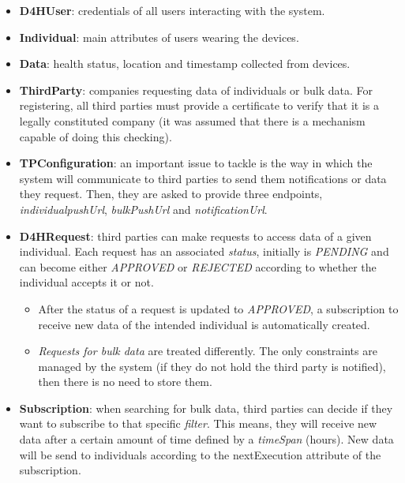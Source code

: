 \documentclass[a4paper, hidelinks, 12pt]{report}
\begin{document}
	\begin{itemize}
		\item{\textbf{D4HUser}}: credentials of all users interacting with the system.
		\item{\textbf{Individual}}: main attributes of users wearing the devices.
		\item{\textbf{Data}}: health status, location and timestamp collected from devices.
		\item{\textbf{ThirdParty}}: companies requesting data of individuals or bulk data. For registering, all third parties must provide a certificate to verify that it is a legally constituted company (it was assumed that there is a mechanism capable of doing this checking).		
		\item{\textbf{TPConfiguration}}: an important issue to tackle is the way in which the system will communicate to third parties to send them notifications or data they request. Then, they are asked to provide three endpoints,
	 \textit{individualpushUrl}, \textit{bulkPushUrl} and \textit{notificationUrl}.	 
		\item{\textbf{D4HRequest}}: third parties can make requests to access data of a given individual. Each request has an associated \textit{status}, initially is \textit{PENDING} and can become either \textit{APPROVED} or \textit{REJECTED} according to whether the individual accepts it or not. 
		\begin{itemize}
		\item After the status of a request is updated to \textit{APPROVED}, a subscription to receive new data of the intended individual is automatically created. 
		\item \textit{Requests for bulk data} are treated differently. The only constraints are managed by the system (if they do not hold the third party is notified), then there is no need to store them.
		\end{itemize}
		\item{\textbf{Subscription}}: when searching for bulk data, third parties can decide if they want to subscribe to that specific \textit{filter}. This means, they will receive new data after a certain amount of time defined by a \textit{timeSpan} (hours). New data will be send to individuals according to the nextExecution attribute of the subscription.
	\end{itemize}
\end{document}
